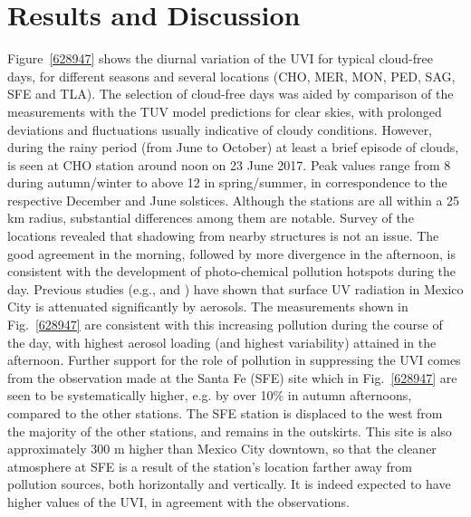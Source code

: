 \documentclass[journal=jacsat,manuscript=article]{achemso}
\begin{document}
\section{Results and Discussion}
\label{results-and-discussion}

Figure~{\ref{628947}} shows the diurnal variation of
the UVI for typical cloud-free days, for different seasons and
several locations (CHO, MER, MON, PED, SAG, SFE and TLA).
The selection of cloud-free days was aided by comparison of the measurements
with the TUV model predictions for clear skies, with prolonged deviations and
fluctuations usually indicative of cloudy conditions. However,
during the rainy period (from June to October) at least a brief episode of clouds,
is seen at CHO station around noon on 23 June
2017. Peak values range from 8 during autumn/winter to above 12
in spring/summer, in correspondence to the respective December and June
solstices. Although the stations are all within a 25 km radius,
substantial differences among them are notable. Survey of the locations
revealed that shadowing from nearby structures is not an issue. The good
agreement in the morning, followed by more divergence in the afternoon,
is consistent with the development of photo-chemical pollution hotspots
during the day. Previous studies (e.g., \citet{Castro_2001} and
\citet{Palancar_2013}) have shown
that surface UV radiation in Mexico City is attenuated significantly by
aerosols. The measurements shown in Fig.~{\ref{628947}}
are consistent with this increasing pollution during the course of the
day, with highest aerosol loading (and highest variability) attained in
the afternoon. Further support for the role of pollution in suppressing
the UVI comes from the observation made at the Santa Fe (SFE) site which
in Fig.~{\ref{628947}} are seen to be systematically
higher, e.g. by over 10\% in autumn afternoons, compared to the other
stations. The SFE station is displaced to the west from the majority of
the other stations, and remains in the outskirts. This site is also
approximately 300 m higher than Mexico City downtown, so that the cleaner atmosphere at SFE
is a result of the station’s location farther away from pollution sources,
both horizontally and vertically.\citep{SEDEMA2018a} It is indeed expected to have
higher values of the UVI, in agreement with the observations.
\end{document}
